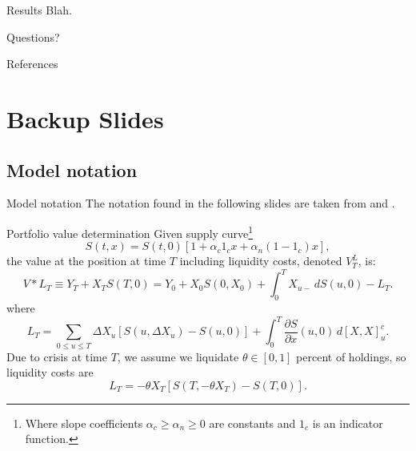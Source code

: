 \documentclass[compress, 10pt, notes]{beamer}  %
\begin{document}
\begin{frame}{Results}
  Blah.
\end{frame}


{
\begin{frame}[standout]
  Questions?
\end{frame}
}
\appendix
\begin{frame}[allowframebreaks]{References}
    \nocite{*}
    \printbibliography[heading=none]
\end{frame}

\section{Backup Slides}
\subsection{Model notation}
\begin{frame}{Model notation}
  The notation found in the following slides are taken from \cite{juri2014} and \cite{jarrow2005liquidity}.
\end{frame}

\begin{frame}{Portfolio value determination}
    Given supply curve\footnote{Where slope coefficients $\alpha_c \geq \alpha_n \geq 0$ are constants and $1_c$ is an indicator function.}
    \begin{equation*}
        S(t,x) = S(t,0)[1+\alpha_c 1_c x + \alpha_n(1-1_c)x],
    \end{equation*}
    the value at the position at time $T$ including liquidity costs, denoted $V^L_T$, is:
    \begin{equation*}
        V*L_T \equiv Y_T + X_T S(T, 0) = Y_0 + X_0 S(0,X_0) + \int_{0}^{T} X_{u-} \,dS(u,0) - L_T.
    \end{equation*}
    where
    \begin{equation*}
        L_T = \sum_{0 \leq u \leq T} \Delta X_u [S(u,\Delta X_u) - S(u,0)] + \int_{0}^{T}\frac{\partial S}{\partial x} (u, 0) \,d[X,X]^c_u.
    \end{equation*}
    Due to crisis at time $T$, we assume we liquidate $\theta \in [0,1]$ percent of holdings, so liquidity costs are
    \begin{equation*}
        L_T = -\theta X_T[S(T,-\theta X_T) - S(T,0)].
    \end{equation*}
\end{frame}
\end{document}
